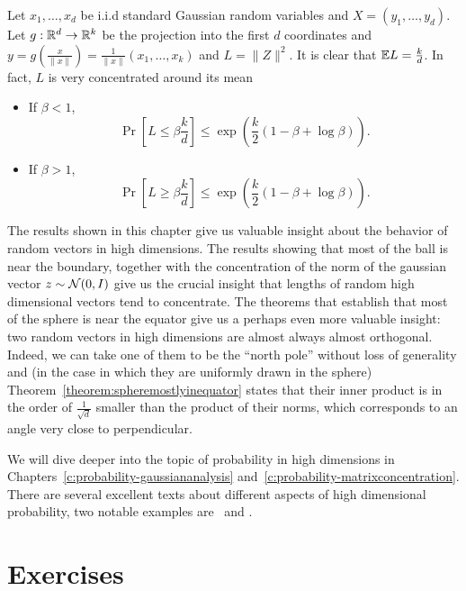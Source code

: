 \begin{lemma}\label{lemma_COM}
 Let $x_1, \ldots,x_d$ be i.i.d standard Gaussian random variables and $X = (y_1,\ldots,y_d)$. Let $g:\mathbb{R}^d\to\mathbb{R}^k$ be the projection into the first $d$ coordinates and $y = g\left(\frac{x}{\|x\|}\right) = \frac1{\|x\|}(x_1,\ldots,x_k)$ and $L = \|Z\|^2$. It is clear that $\mathbb{E} L = \frac{k}d$. In fact, $L$ is very concentrated around its mean
\begin{itemize}
 \item If $\beta<1$,
\[
 \Pr\left[ L \leq \beta \frac{k}d\right] \leq \exp\left( \frac{k}2(1-\beta +\log\beta) \right).
\]
 \item If $\beta>1$,
\[
 \Pr\left[ L \geq \beta \frac{k}d\right] \leq \exp\left( \frac{k}2(1-\beta +\log\beta) \right).
\]
\end{itemize}

\end{lemma}


\begin{remark}
The results shown in this chapter give us valuable insight about the behavior of random vectors in high dimensions. The results showing that most of the ball is near the boundary, together with the concentration of the norm of the gaussian vector $z\sim\mathcal{N}(0,I)$ give us the crucial insight that lengths of random high dimensional vectors tend to concentrate. The theorems that establish that most of the sphere is near the equator give us a perhaps even more valuable insight: two random vectors in high dimensions are almost always almost orthogonal. Indeed, we can take one of them to be the ``north pole'' without loss of generality and (in the case in which they are uniformly drawn in the sphere) Theorem~\ref{theorem:spheremostlyinequator} states that their inner product is in the order of $\frac{1}{\sqrt{d}}$ smaller than the product of their norms, which corresponds to an angle very close to perpendicular.
\end{remark}

We will dive deeper into the topic of probability in high dimensions in Chapters~\ref{c:probability-gaussiananalysis} and~\ref{c:probability-matrixconcentration}. There are several excellent texts about different aspects of high dimensional probability, two notable examples are~\cite{vanHandel_LectureNotesProb_14} and \cite{vershynin2018}.




\section*{Exercises}\label{sec:ex2}

